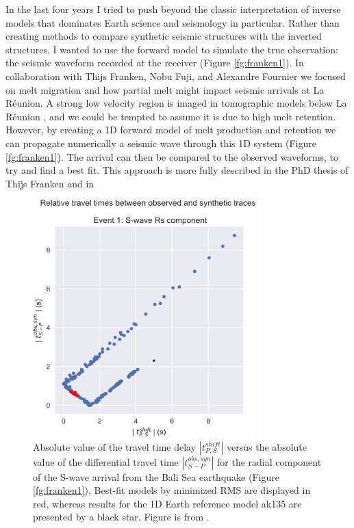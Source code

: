 In the last four years I tried to push beyond the classic interpretation of inverse models that dominates Earth science and seismology in particular. Rather than creating methods to compare synthetic seismic structures with the inverted structures, I wanted to use the forward model to simulate the true observation: the seismic waveform recorded at the receiver (Figure \ref{fg:franken1}). In collaboration with Thijs Franken, Nobu Fuji, and Alexandre Fournier we focused on melt migration and how partial melt might impact seismic arrivals at La Réunion.  A strong low velocity region is imaged in tomographic models below La Réunion \citep{mazzullo-etal-2017}, and we could be tempted to assume it is due to high melt retention. However, by creating a 1D forward model of melt production and retention we can propagate numerically a seismic wave through this 1D system (Figure \ref{fg:franken1}). The arrival can then be compared to the observed waveforms, to try and find a best fit. This approach is more fully described in the PhD thesis of Thijs Franken and in \cite{franken-etal-2020}

\begin{figure}
    \centering
    \includegraphics[width=8.6cm]{./figures/ch2-franken2.png}
    \caption{Absolute value of the travel time delay $| t^{shift}_{P,S} |$ versus the absolute value of the differential travel time $| t^{obs,syn}_{S-P} |$ for the radial component of the S-wave arrival from the Bali Sea earthquake (Figure \ref{fg:franken1}). Best-fit models by minimized RMS are displayed in red, whereas results for the 1D Earth reference model ak135 are presented by a black star. Figure is from \cite{franken-etal-2020}.}
    \label{fg:franken2}
\end{figure}


